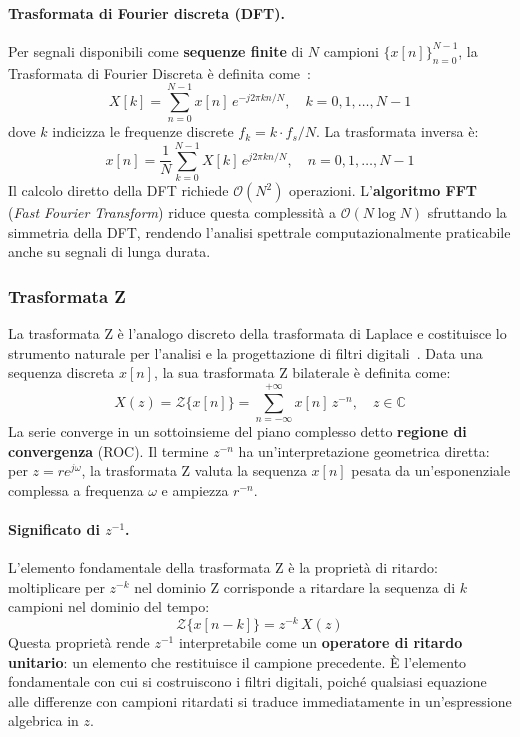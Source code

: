 \paragraph{Trasformata di Fourier discreta (DFT).}
Per segnali disponibili come \textbf{sequenze finite} di $N$ campioni $\{x[n]\}_{n=0}^{N-1}$, la Trasformata di Fourier Discreta è definita come~\cite{oppenheim1997dsp}:
\[
X[k] = \sum_{n=0}^{N-1} x[n]\, e^{-j2\pi kn/N},
\quad k = 0, 1, \ldots, N-1
\]
dove $k$ indicizza le frequenze discrete $f_k = k \cdot f_s / N$. La trasformata inversa è:
\[
x[n] = \frac{1}{N} \sum_{k=0}^{N-1} X[k]\, e^{j2\pi kn/N},
\quad n = 0, 1, \ldots, N-1
\]
Il calcolo diretto della DFT richiede $\mathcal{O}(N^2)$ operazioni. L'\textbf{algoritmo FFT} (\textit{Fast Fourier Transform}) riduce questa complessità a $\mathcal{O}(N \log N)$ sfruttando la simmetria della DFT, rendendo l'analisi spettrale computazionalmente praticabile anche su segnali di lunga durata.

\subsubsection{Trasformata Z}
La trasformata Z è l'analogo discreto della trasformata di Laplace e costituisce lo strumento naturale per l'analisi e la progettazione di filtri digitali~\cite{oppenheim1997dsp}. Data una sequenza discreta $x[n]$, la sua trasformata Z bilaterale è definita come:
\[
X(z) = \mathcal{Z}\{x[n]\} = \sum_{n=-\infty}^{+\infty}
x[n]\, z^{-n}, \quad z \in \mathbb{C}
\]
La serie converge in un sottoinsieme del piano complesso detto \textbf{regione di convergenza} (ROC). Il termine $z^{-n}$ ha un'interpretazione geometrica diretta: per $z = r e^{j\omega}$, la trasformata Z valuta la sequenza $x[n]$ pesata da un'esponenziale complessa a frequenza $\omega$ e ampiezza $r^{-n}$.

\paragraph{Significato di $z^{-1}$.}
L'elemento fondamentale della trasformata Z è la proprietà di ritardo: moltiplicare per $z^{-k}$ nel dominio Z corrisponde a ritardare la sequenza di $k$ campioni nel dominio del tempo:
\[
\mathcal{Z}\{x[n-k]\} = z^{-k}\, X(z)
\]
Questa proprietà rende $z^{-1}$ interpretabile come un \textbf{operatore di ritardo unitario}: un elemento che restituisce il campione precedente. È l'elemento fondamentale con cui si costruiscono i filtri digitali, poiché qualsiasi equazione alle differenze con campioni ritardati si traduce immediatamente in un'espressione algebrica in $z$.

